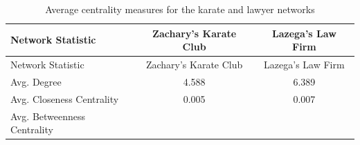 \documentclass[12pt,twoside]{amherstthesis}
\begin{document}
  \begin{longtable}[]{@{}lcc@{}}
  \caption{Average centrality measures for the karate and lawyer networks
  \label{tab:avgcent}}\tabularnewline
  \toprule
  \begin{minipage}[b]{0.34\columnwidth}\raggedright\strut
  Network Statistic\strut
  \end{minipage} & \begin{minipage}[b]{0.29\columnwidth}\centering\strut
  Zachary's Karate Club\strut
  \end{minipage} & \begin{minipage}[b]{0.29\columnwidth}\centering\strut
  Lazega's Law Firm\strut
  \end{minipage}\tabularnewline
  \midrule
  \endfirsthead
  \toprule
  \begin{minipage}[b]{0.34\columnwidth}\raggedright\strut
  Network Statistic\strut
  \end{minipage} & \begin{minipage}[b]{0.29\columnwidth}\centering\strut
  Zachary's Karate Club\strut
  \end{minipage} & \begin{minipage}[b]{0.29\columnwidth}\centering\strut
  Lazega's Law Firm\strut
  \end{minipage}\tabularnewline
  \midrule
  \endhead
  \begin{minipage}[t]{0.34\columnwidth}\raggedright\strut
  Avg. Degree\strut
  \end{minipage} & \begin{minipage}[t]{0.29\columnwidth}\centering\strut
  4.588\strut
  \end{minipage} & \begin{minipage}[t]{0.29\columnwidth}\centering\strut
  6.389\strut
  \end{minipage}\tabularnewline
  \begin{minipage}[t]{0.34\columnwidth}\raggedright\strut
  Avg. Closeness Centrality\strut
  \end{minipage} & \begin{minipage}[t]{0.29\columnwidth}\centering\strut
  0.005\strut
  \end{minipage} & \begin{minipage}[t]{0.29\columnwidth}\centering\strut
  0.007\strut
  \end{minipage}\tabularnewline
  \begin{minipage}[t]{0.34\columnwidth}\raggedright\strut
  Avg. Betweenness Centrality\strut
  \end{minipage} & \begin{minipage}[t]{0.29\columnwidth}\centering\strut

\end{minipage}
\end{longtable}
\end{document}
